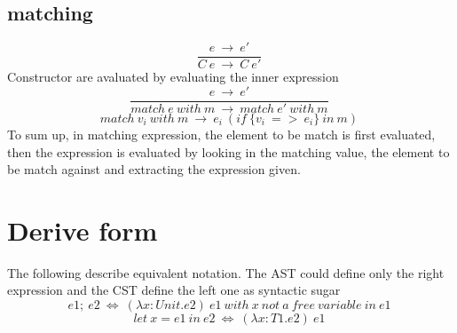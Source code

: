 \documentclass[10pt,a4paper]{article}
\begin{document}
\subsection*{ matching }
\begin{equation}\frac{e\ \rightarrow \ e'}{C\ e\ \rightarrow \ C\ e'}\ \tag{\ E-CONST\ }\end{equation}
Constructor are avaluated by evaluating the inner expression
\begin{equation}\frac{e\ \rightarrow \ e'}{match\ e\ with\ m\ \rightarrow \ match\ e'\ with\ m}\ \tag{\ E-MATCH1\ }\end{equation}
\begin{equation}match\ v_i\ with\ m\ \rightarrow \ e_i\ (if\ \{v_i\ =>\ e_i\}\ in\ m)\ \tag{\ E-MATCH2\ }\end{equation}
To sum up, in matching expression, the element to be match is first evaluated, then
the expression is evaluated by looking in the matching value, the element to be match against and extracting the expression given. 



\section*{ Derive form }
The following describe equivalent notation. The AST could define only the right expression and the CST define the left one as syntactic sugar
\begin{equation*}e1;\ e2\ \iff \ (\lambda x:Unit.e2)\ e1\ with\ x\ not\ a\ free\ variable\ in\ e1 \ \end{equation*}
\begin{equation*}let\ x=e1\ in\ e2\ \iff\ (\lambda x:T1.e2)\ e1 \ \end{equation*}
\end{document}
